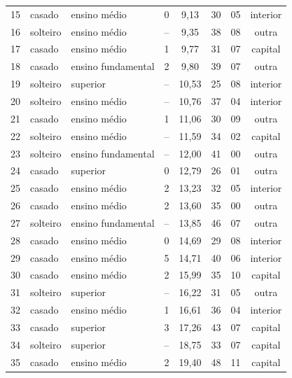 \documentclass[12pt]{article}
\begin{document}
\begin{enumerate} [label=\arabic*.]
\begin{table}[H]
{\begin{tabular}{c|l|l|c|c|c|c|c}
                15 & casado   & ensino médio       & 0  & 9,13  & 30 & 05 & interior \\
                16 & solteiro & ensino médio       & -- & 9,35  & 38 & 08 & outra \\
                17 & casado   & ensino médio       & 1  & 9,77  & 31 & 07 & capital \\
                18 & casado   & ensino fundamental & 2  & 9,80  & 39 & 07 & outra \\
                19 & solteiro & superior            & -- & 10,53 & 25 & 08 & interior \\
                20 & solteiro & ensino médio       & -- & 10,76 & 37 & 04 & interior \\
                21 & casado   & ensino médio       & 1  & 11,06 & 30 & 09 & outra \\
                22 & solteiro & ensino médio       & -- & 11,59 & 34 & 02 & capital \\
                23 & solteiro & ensino fundamental & -- & 12,00 & 41 & 00 & outra \\
                24 & casado   & superior            & 0  & 12,79 & 26 & 01 & outra \\
                25 & casado   & ensino médio       & 2  & 13,23 & 32 & 05 & interior \\
                26 & casado   & ensino médio       & 2  & 13,60 & 35 & 00 & outra \\
                27 & solteiro & ensino fundamental & -- & 13,85 & 46 & 07 & outra \\
                28 & casado   & ensino médio       & 0  & 14,69 & 29 & 08 & interior \\
                29 & casado   & ensino médio       & 5  & 14,71 & 40 & 06 & interior \\
                30 & casado   & ensino médio       & 2  & 15,99 & 35 & 10 & capital \\
                31 & solteiro & superior            & -- & 16,22 & 31 & 05 & outra \\
                32 & casado   & ensino médio       & 1  & 16,61 & 36 & 04 & interior \\
                33 & casado   & superior            & 3  & 17,26 & 43 & 07 & capital \\
                34 & solteiro & superior            & -- & 18,75 & 33 & 07 & capital \\
                35 & casado   & ensino médio       & 2  & 19,40 & 48 & 11 & capital \\

\end{tabular}}
\end{table}
\end{enumerate}
\end{document}

